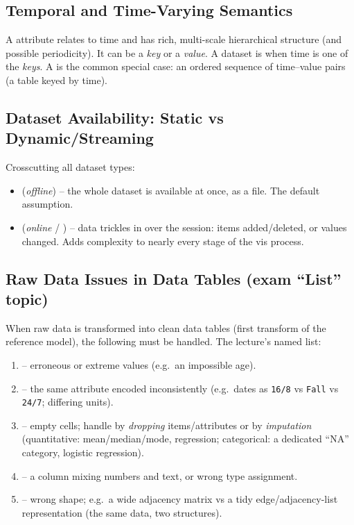 \subsection{Temporal and Time-Varying Semantics}
A  attribute relates to time and has rich, multi-scale hierarchical
structure (and possible periodicity). It can be a \emph{key} or a \emph{value}. A
dataset is  when time is one of the \emph{keys}. A
 is the common special case: an ordered sequence of time--value
pairs (a table keyed by time).

\subsection{Dataset Availability: Static vs Dynamic/Streaming}
Crosscutting all dataset types:
\begin{itemize}
  \item {} (\emph{offline}) -- the whole dataset is available at once, as a file. The default assumption.
  \item {} (\emph{online} / ) -- data trickles in over the session: items added/deleted, or values changed. Adds complexity to nearly every stage of the vis process.
\end{itemize}

\subsection{Raw Data Issues in Data Tables (exam ``List'' topic)}

When raw data is transformed into clean data tables (first transform of the
reference model), the following  must be handled. The
lecture's named list:

\begin{keybox}
\begin{enumerate}[label=\arabic*.]
  \item {} -- erroneous or extreme values (e.g.\ an impossible age).
  \item {} -- the same attribute encoded inconsistently (e.g.\ dates as \texttt{16/8} vs \texttt{Fall} vs \texttt{24/7}; differing units).
  \item {} -- empty cells; handle by \emph{dropping} items/attributes or by \emph{imputation} (quantitative: mean/median/mode, regression; categorical: a dedicated ``NA'' category, logistic regression).
  \item {} -- a column mixing numbers and text, or wrong type assignment.
  \item {} -- wrong shape; e.g.\ a wide adjacency matrix vs a tidy edge/adjacency-list representation (the same data, two structures).
\end{enumerate}
\end{keybox}

